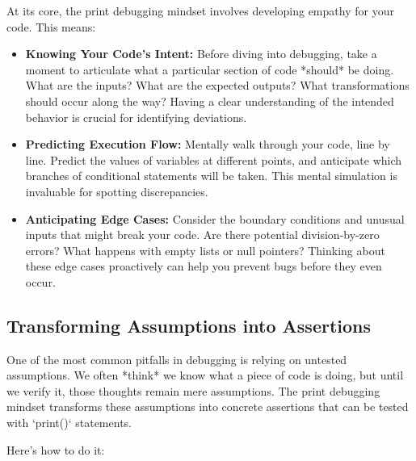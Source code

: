 \documentclass{article}
\begin{document}
At its core, the print debugging mindset involves developing empathy for your code. This means:

\begin{itemize}
    \item \textbf{Knowing Your Code's Intent:} Before diving into debugging, take a moment to articulate what a particular section of code *should* be doing. What are the inputs? What are the expected outputs? What transformations should occur along the way? Having a clear understanding of the intended behavior is crucial for identifying deviations.

    \item \textbf{Predicting Execution Flow:} Mentally walk through your code, line by line. Predict the values of variables at different points, and anticipate which branches of conditional statements will be taken. This mental simulation is invaluable for spotting discrepancies.

    \item \textbf{Anticipating Edge Cases:} Consider the boundary conditions and unusual inputs that might break your code. Are there potential division-by-zero errors? What happens with empty lists or null pointers? Thinking about these edge cases proactively can help you prevent bugs before they even occur.
\end{itemize}

\subsection*{Transforming Assumptions into Assertions}

One of the most common pitfalls in debugging is relying on untested assumptions. We often *think* we know what a piece of code is doing, but until we verify it, those thoughts remain mere assumptions. The print debugging mindset transforms these assumptions into concrete assertions that can be tested with `print()` statements.

Here's how to do it:
\end{document}
